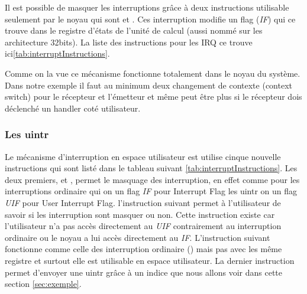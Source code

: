 Il est possible de masquer les interruptions grâce à deux instructions utilisable seulement par le noyau qui sont  et .
Ces interruption modifie un flag (\emph{IF}) qui ce trouve dans le registre d'états de l'unité de calcul  (aussi nommé  sur les architecture 32bits).
La liste des instructions pour les IRQ ce trouve ici\ref{tab:interruptInstructions}.

Comme on la vue ce mécanisme fonctionne totalement dans le noyau du système.
Dans notre exemple il faut au minimum deux changement de contexte (context switch) pour le récepteur et l'émetteur et même peut être plus si le récepteur dois déclenché un handler coté utilisateur.


\subsubsection{Les uintr}
\label{sec:uintrDetails}

Le mécanisme d'interruption en espace utilisateur est utilise cinque nouvelle instructions qui sont listé dans le tableau suivant \ref{tab:interruptInstructions}.
Les deux premiers,  et , permet le masquage des interruption, en effet comme pour les interruptions ordinaire qui on un flag \emph{IF} pour Interrupt Flag les uintr on un flag \emph{UIF} pour User Interrupt Flag.
l'instruction suivant  permet à l'utilisateur de savoir si les interruption sont masquer ou non.
Cette instruction existe car l'utilisateur n'a pas accès directement au \emph{UIF} contrairement au interruption ordinaire ou le noyau a lui accès directement au \emph{IF}.
L'instruction suivant  fonctionne comme celle des interruption ordinaire () mais pas avec les même registre et surtout elle est utilisable en espace utilisateur.
La dernier instruction permet d'envoyer une uintr grâce à un indice que nous allons voir dans cette section \ref{sec:exemple}.

